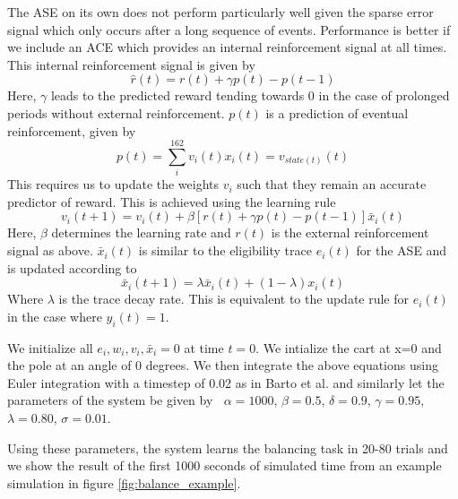 \documentclass{article}
\begin{document}
The ASE on its own does not perform particularly well given the sparse error signal which only occurs after a long sequence of events. Performance is better if we include an ACE which provides an internal reinforcement signal at all times.
This internal reinforcement signal is given by
\begin{equation}
\hat r(t) = r(t) + \gamma p(t) - p(t-1)
\end{equation}
Here, $\gamma$ leads to the predicted reward tending towards 0 in the case of prolonged periods without external reinforcement.
$p(t)$ is a prediction of eventual reinforcement, given by
\begin{equation}
p(t) = \sum_i^{162}{v_i(t)x_i(t) = v_{state(t)}(t)}
\end{equation}
This requires us to update the weights $v_i$ such that they remain an accurate predictor of reward. This is achieved using the learning rule
\begin{equation}
v_i(t+1) = v_i(t) + \beta[r(t) + \gamma p(t) - p(t-1)] \bar x_i(t)
\end{equation}
Here, $\beta$ determines the learning rate and $r(t)$ is the external reinforcement signal as above. $\bar x_i(t)$ is similar to the eligibility trace $e_i(t)$ for the ASE and is updated according to
\begin{equation}
\bar x_i(t+1) = \lambda \bar x_i(t) + (1-\lambda)x_i(t) 
\end{equation}
Where $\lambda$ is the trace decay rate. This is equivalent to the update rule for $e_i(t)$ in the case where $y_i(t) = 1$.


We initialize all $e_i, w_i, v_i, \bar x_i = 0$ at time $t=0$.
We intialize the cart at x=0 and the pole at an angle of 0 degrees.
We then integrate the above equations using Euler integration with a timestep of 0.02 as in Barto et al. and similarly let the parameters of the system be given by $~$
$\alpha = 1000$,
$\beta = 0.5$,
$\delta = 0.9$,
$\gamma = 0.95$,
$\lambda = 0.80$,
$\sigma = 0.01$.

Using these parameters, the system learns the balancing task in 20-80 trials and we show the result of the first 1000 seconds of simulated time from an example simulation in figure \ref{fig:balance_example}.
\end{document}

